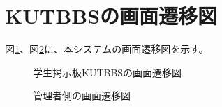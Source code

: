 \documentclass[a4j]{jarticle}
\begin{document}
\section{KUTBBSの画面遷移図}
\label{Screen_transition}
図\ref{fig:Screen_transition_1}、図\ref{fig:Screen_transition_2}に、本システムの画面遷移図を示す。
\begin{figure}[H]
\centering
{}
\caption{学生掲示板KUTBBSの画面遷移図}
\label{fig:Screen_transition_1}
\end{figure}

\begin{figure}[H]
\centering
{}
\caption{管理者側の画面遷移図}
\label{fig:Screen_transition_2}
\end{figure}
\end{document}
